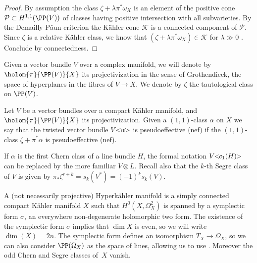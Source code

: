 \begin{proof}
By assumption the class $\zeta+ \lambda \pi^* \omega_X$ is an element of the
positive cone $\mathcal P \subset H^{1,1}(\PP(V))$ of classes having positive intersection with all subvarieties. By the Demailly-P\v aun criterion \cite[Th.\,0.1]{DP04}
the Kähler cone $\mathcal K$ is a connected component of $\mathcal P$.
Since $\zeta$ is a relative Kähler class, we know that $(\zeta+ \lambda \pi^* \omega_X) \in \mathcal K$ for $\lambda \gg 0$ \cite[Proof of Prop.\,3.18]{Voi02}. Conclude by connectedness.
\end{proof}

Given a vector bundle $V$ over a complex manifold, we will denote by
$\holom{\pi}{\PP(V)}{X}$ its projectivization in the sense of Grothendieck, \ie
the space of hyperplanes in the fibres of $V \to X$. We denote by $\zeta$ the tautological class on $\PP(V)$.

\begin{definition}\label{definitionpseff} 
Let $V$ be a vector bundles over a compact Kähler manifold, and $\holom{\pi}{\PP(V)}{X}$ its projectivization. Given a $(1,1)$-class $\alpha$ on $X$ we say that the twisted vector bundle
$V\hspace{-0.8ex}<\hspace{-0.8ex}\alpha\hspace{-0.8ex}>$ is pseudoeffective (\resp nef) if
the $(1,1)$-class $\zeta+\pi^* \alpha$ is pseudoeffective (\resp nef).
\end{definition}

If $\alpha$ is the first Chern class of a line bundle $H$, the formal notation $V\hspace{-0.8ex}<\hspace{-0.8ex}c_1(H)\hspace{-0.8ex}>$ can be replaced by the more familiar
$V \otimes L$. Recall also \cite[Ex.\,8.3.5]{Laz04b} that the $k$-th Segre class of $V$ is given by $\pi_* \zeta^{r+k}= s_k(V^*) = (-1)^k s_k(V)$.

A (not necessarily projective) Hyperkähler manifold is a simply connected compact Kähler manifold $X$ such that $H^0(X, \Omega_X^2)$ is spanned by a symplectic form $\sigma$, \ie an everywhere non-degenerate holomorphic two form.
The existence of the symplectic form $\sigma$ implies that $\dim X$ is even, so we will write $\dim(X)=2n$.
The symplectic form defines an isomorphism $T_X \to \Omega_X$, so
we can also consider $\PP(\Omega_X)$ as the
space of lines, allowing us to use \eg \cite{Kob87}.
Moreover the odd Chern and Segre classes of~$X$ vanish.

